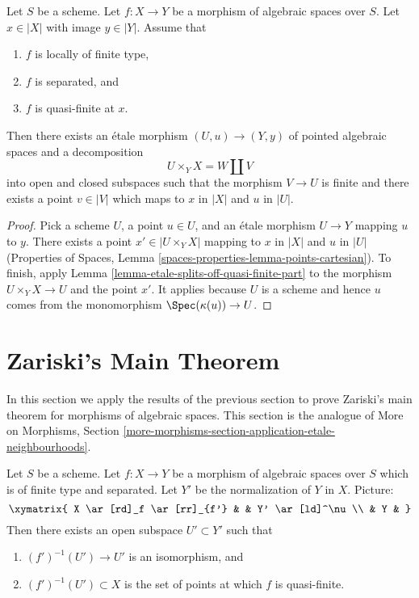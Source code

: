 \begin{lemma}
\label{lemma-etale-splits-off-just-one-quasi-finite-part}
Let $S$ be a scheme.
Let $f : X \to Y$ be a morphism of algebraic spaces over $S$.
Let $x \in |X|$ with image $y \in |Y|$. Assume that
\begin{enumerate}
\item $f$ is locally of finite type,
\item $f$ is separated, and
\item $f$ is quasi-finite at $x$.
\end{enumerate}
Then there exists an \'etale morphism $(U, u) \to (Y, y)$
of pointed algebraic spaces and a decomposition
$$
U \times_Y X = W \amalg V
$$
into open and closed subspaces such that the morphism $V \to U$ is finite
and there exists a point $v \in |V|$ which maps to $x$ in $|X|$
and $u$ in $|U|$.
\end{lemma}

\begin{proof}
Pick a scheme $U$, a point $u \in U$, and an \'etale morphism
$U \to Y$ mapping $u$ to $y$. There exists a point $x' \in |U \times_Y X|$
mapping to $x$ in $|X|$ and $u$ in $|U|$ (Properties of Spaces,
Lemma \ref{spaces-properties-lemma-points-cartesian}).
To finish, apply Lemma \ref{lemma-etale-splits-off-quasi-finite-part}
to the morphism $U \times_Y X \to U$ and the point $x'$.
It applies because $U$ is a scheme and hence $u$ comes from
the monomorphism $\Spec(\kappa(u)) \to U$.
\end{proof}










\section{Zariski's Main Theorem}
\label{section-structure-quasi-finite}

\noindent
In this section we apply the results of the previous section to
prove Zariski's main theorem for morphisms of algebraic spaces.
This section is the analogue of More on Morphisms, Section
\ref{more-morphisms-section-application-etale-neighbourhoods}.

\begin{lemma}
\label{lemma-finite-type-separated}
Let $S$ be a scheme. Let $f : X \to Y$ be a morphism of algebraic
spaces over $S$ which is of finite type and separated.
Let $Y'$ be the normalization of $Y$ in $X$. Picture:
$$
\xymatrix{
X \ar[rd]_f \ar[rr]_{f'} & & Y' \ar[ld]^\nu \\
& Y &
}
$$
Then there exists an open subspace $U' \subset Y'$ such that
\begin{enumerate}
\item $(f')^{-1}(U') \to U'$ is an isomorphism, and
\item $(f')^{-1}(U') \subset X$ is the set of points at which
$f$ is quasi-finite.
\end{enumerate}
\end{lemma}

